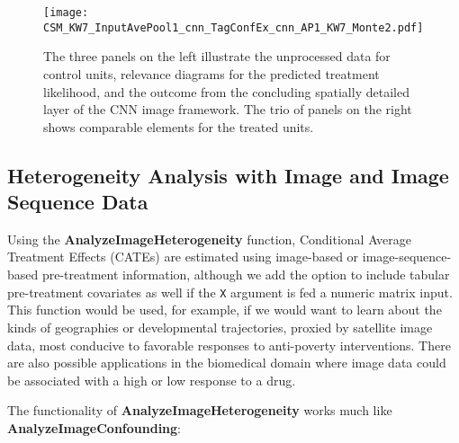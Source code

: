 \documentclass[nojss,shortnames]{jss} %
\begin{document}
\begin{figure}[H]
 \centering \texttt{[image: CSM\_KW7\_InputAvePool1\_cnn\_TagConfEx\_cnn\_AP1\_KW7\_Monte2.pdf]}
    \caption{The three panels on the left illustrate the unprocessed data for control units, relevance diagrams for the predicted treatment likelihood, and the outcome from the concluding spatially detailed layer of the CNN image framework. The trio of panels on the right shows comparable elements for the treated units.}\label{fig:InsideConvnet}
\end{figure} 

\subsection{Heterogeneity Analysis with Image and Image Sequence Data }\label{s:Hetero}
Using the {\bf AnalyzeImageHeterogeneity} function, Conditional Average Treatment Effects (CATEs) are estimated using image-based or image-sequence-based pre-treatment information, although we add the option to include tabular pre-treatment covariates as well if the \texttt{X} argument is fed a numeric matrix input. This function would be used, for example, if we would want to learn about the kinds of geographies or developmental trajectories, proxied by satellite image data, most conducive to favorable responses to anti-poverty interventions. There are also possible applications in the biomedical domain where image data could be associated with a high or low response to a drug. 

The functionality of {\bf AnalyzeImageHeterogeneity} works much like {\bf AnalyzeImageConfounding}:
\end{document}
